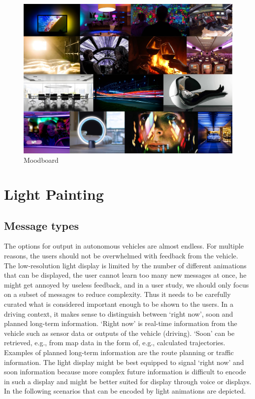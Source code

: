 \begin{figure}
\centering
    \includegraphics[width=1.\textwidth]{fig/moodboard_G.jpg}
    \caption[Moodboard]{Moodboard}
    \label{fig:smoodboard}
\end{figure}
\section{Light Painting}
\label{sec:lightPainting}
\subsection{Message types}
The options for output in autonomous vehicles are almost endless. For multiple reasons, the users should not be overwhelmed with feedback from the vehicle. The low-resolution light display is limited by the number of different animations that can be displayed, the user cannot learn too many new messages at once, he might get annoyed by useless feedback, and in a user study, we should only focus on a subset of messages to reduce complexity. Thus it needs to be carefully curated what is considered important enough to be shown to the users. In a driving context, it makes sense to distinguish between ‘right now’, soon and planned long-term information. ‘Right now’ is real-time information from the vehicle such as sensor data or outputs of the vehicle (driving). ‘Soon’ can be retrieved, e.g., from map data in the form of, e.g., calculated trajectories. Examples of planned long-term information are the route planning or traffic information. The light display might be best equipped to signal ‘right now’ and soon information because more complex future information is difficult to encode in such a display and might be better suited for display through voice or displays. In the following scenarios that can be encoded by light animations are depicted. 


